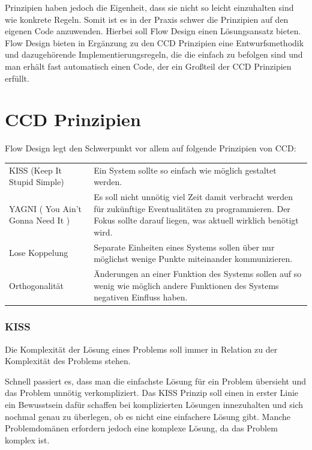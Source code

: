 Prinzipien haben jedoch die Eigenheit, dass sie nicht so leicht einzuhalten sind wie konkrete Regeln.
Somit ist es in der Praxis schwer die Prinzipien auf den eigenen Code anzuwenden.
Hierbei soll Flow Design einen Lösungsansatz bieten. Flow Design bieten in
Ergänzung zu den CCD Prinzipien eine Entwurfsmethodik und dazugehörende Implementierungsregeln, die
die einfach zu befolgen sind und man erhält fast automatisch einen Code, der ein Großteil der CCD Prinzipien erfüllt.

\section{CCD Prinzipien}

Flow Design legt den Schwerpunkt vor allem auf folgende Prinzipien von CCD:

\bigskip

\begin{tabularx}{\textwidth}{p{160 pt}|X}
KISS (Keep It Stupid Simple) & Ein System sollte so einfach wie möglich gestaltet werden. \\
YAGNI ( You Ain't Gonna Need It ) & Es soll nicht unnötig viel Zeit damit verbracht werden für zukünftige Eventualitäten zu programmieren. 
Der Fokus sollte darauf liegen, was aktuell wirklich benötigt wird. \\
Lose Koppelung & Separate Einheiten eines Systems sollen über nur möglichst  wenige Punkte miteinander kommunizieren. \\
Orthogonalität & Änderungen an einer Funktion des Systems sollen auf so wenig wie möglich andere Funktionen des Systems negativen Einfluss haben. \\
\end{tabularx}

\subsubsection{KISS}

Die Komplexität der Lösung eines Problems soll immer in Relation zu der
Komplexität des Problems stehen.

Schnell passiert es, dass man die einfachste Lösung für ein Problem übersieht und das Problem unnötig verkompliziert.
Das KISS Prinzip soll einen in erster Linie ein Bewusstsein dafür schaffen bei
komplizierten Lösungen innezuhalten und sich nochmal genau zu
überlegen, ob es nicht eine einfachere Lösung gibt.
Manche Problemdomänen erfordern jedoch eine komplexe Lösung, da das Problem
komplex ist.

